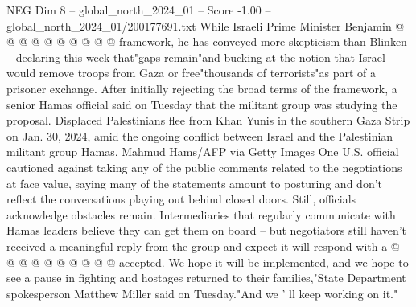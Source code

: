 \begin{textsample}{NEG Dim 8 – global\_north\_2024\_01 – Score -1.00 – global\_north\_2024\_01/200177691.txt}
While Israeli Prime Minister Benjamin @ @ @ @ @ @ @ @ @ @ framework, he has conveyed more skepticism than Blinken -- declaring this week that"gaps remain"and bucking at the notion that Israel would remove troops from Gaza or free"thousands of terrorists"as part of a prisoner exchange.
After initially rejecting the broad terms of the framework, a senior Hamas official said on Tuesday that the militant group was studying the proposal.
Displaced Palestinians flee from Khan Yunis in the southern Gaza Strip on Jan. 30, 2024, amid the ongoing conflict between Israel and the Palestinian militant group Hamas.
Mahmud Hams/AFP via Getty Images One U.S. official cautioned against taking any of the public comments related to the negotiations at face value, saying many of the statements amount to posturing and don't reflect the conversations playing out behind closed doors.
Still, officials acknowledge obstacles remain.
Intermediaries that regularly communicate with Hamas leaders believe they can get them on board -- but negotiators still haven't received a meaningful reply from the group and expect it will respond with a @ @ @ @ @ @ @ @ @ @ accepted.
We hope it will be implemented, and we hope to see a pause in fighting and hostages returned to their families,"State Department spokesperson Matthew Miller said on Tuesday."And we ' ll keep working on it."

\end{textsample}
